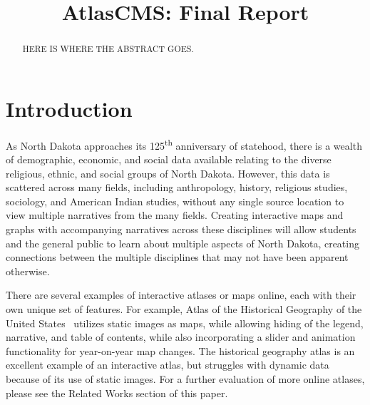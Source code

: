 \documentclass[11pt, draftcls, conference, onecolumn]{IEEEtran}
\begin{document}
\title{AtlasCMS: Final Report}

\author{


\and


}

\maketitle

\begin{abstract}

HERE IS WHERE THE ABSTRACT GOES.

\end{abstract}

\IEEEpeerreviewmaketitle

\section{Introduction}

As North Dakota approaches its 125\textsuperscript{th} anniversary of statehood, there is a wealth of demographic, economic, and social data available relating to the diverse religious, ethnic, and social groups of North Dakota. However, this data is scattered across many fields, including anthropology, history, religious studies, sociology, and American Indian studies, without any single source location to view multiple narratives from the many fields. Creating interactive maps and graphs with accompanying narratives across these disciplines will allow students and the general public to learn about multiple aspects of North Dakota, creating connections between the multiple disciplines that may not have been apparent otherwise.

There are several examples of interactive atlases or maps online, each with their own unique set of features. For example, Atlas of the Historical Geography of the United States~\cite{us-historical-atlas-2014} utilizes static images as maps, while allowing hiding of the legend, narrative, and table of contents, while also incorporating a slider and animation functionality for year-on-year map changes.  The historical geography atlas is an excellent example of an interactive atlas, but struggles with dynamic data because of its use of static images. For a further evaluation of more online atlases, please see the Related Works section of this paper.
\end{document}

